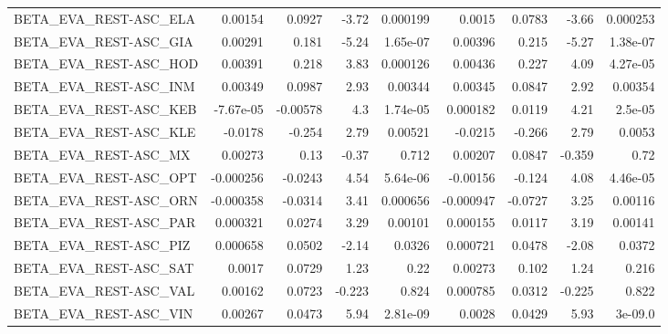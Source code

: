 \begin{tabular}{lrrrrrrrr}
BETA\_EVA\_REST-ASC\_ELA                  &     0.00154 &       0.0927 &   -3.72 & 0.000199 &     0.0015 &      0.0783 &        -3.66 &      0.000253 \\
BETA\_EVA\_REST-ASC\_GIA                  &     0.00291 &        0.181 &   -5.24 & 1.65e-07 &    0.00396 &       0.215 &        -5.27 &      1.38e-07 \\
BETA\_EVA\_REST-ASC\_HOD                  &     0.00391 &        0.218 &    3.83 & 0.000126 &    0.00436 &       0.227 &         4.09 &      4.27e-05 \\
BETA\_EVA\_REST-ASC\_INM                  &     0.00349 &       0.0987 &    2.93 &  0.00344 &    0.00345 &      0.0847 &         2.92 &       0.00354 \\
BETA\_EVA\_REST-ASC\_KEB                  &   -7.67e-05 &     -0.00578 &     4.3 & 1.74e-05 &   0.000182 &      0.0119 &         4.21 &       2.5e-05 \\
BETA\_EVA\_REST-ASC\_KLE                  &     -0.0178 &       -0.254 &    2.79 &  0.00521 &    -0.0215 &      -0.266 &         2.79 &        0.0053 \\
BETA\_EVA\_REST-ASC\_MX                   &     0.00273 &         0.13 &   -0.37 &    0.712 &    0.00207 &      0.0847 &       -0.359 &          0.72 \\
BETA\_EVA\_REST-ASC\_OPT                  &   -0.000256 &      -0.0243 &    4.54 & 5.64e-06 &   -0.00156 &      -0.124 &         4.08 &      4.46e-05 \\
BETA\_EVA\_REST-ASC\_ORN                  &   -0.000358 &      -0.0314 &    3.41 & 0.000656 &  -0.000947 &     -0.0727 &         3.25 &       0.00116 \\
BETA\_EVA\_REST-ASC\_PAR                  &    0.000321 &       0.0274 &    3.29 &  0.00101 &   0.000155 &      0.0117 &         3.19 &       0.00141 \\
BETA\_EVA\_REST-ASC\_PIZ                  &    0.000658 &       0.0502 &   -2.14 &   0.0326 &   0.000721 &      0.0478 &        -2.08 &        0.0372 \\
BETA\_EVA\_REST-ASC\_SAT                  &      0.0017 &       0.0729 &    1.23 &     0.22 &    0.00273 &       0.102 &         1.24 &         0.216 \\
BETA\_EVA\_REST-ASC\_VAL                  &     0.00162 &       0.0723 &  -0.223 &    0.824 &   0.000785 &      0.0312 &       -0.225 &         0.822 \\
BETA\_EVA\_REST-ASC\_VIN                  &     0.00267 &       0.0473 &    5.94 & 2.81e-09 &     0.0028 &      0.0429 &         5.93 &       3e-09.0 \\

\end{tabular}
